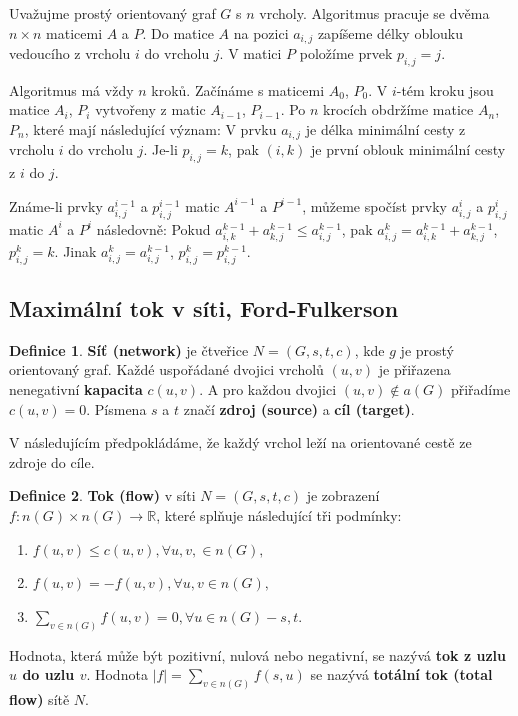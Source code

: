 \documentclass[a4]{report}
\theoremstyle{definition}
\newtheorem{definition}{Definice}[section]
\begin{document}
Uvažujme prostý orientovaný graf $G$ s $n$ vrcholy. Algoritmus pracuje se dvěma $n \times n$
maticemi $A$ a $P$. Do matice $A$ na pozici $a_{i,j}$ zapíšeme délky oblouku vedoucího z vrcholu $i$ do vrcholu $j$. V matici $P$ položíme prvek $p_{i,j} = j$.

Algoritmus má vždy $n$ kroků. Začínáme s maticemi $A_0$, $P_0$. V $i$-tém kroku jsou matice $A_i$, $P_i$ vytvořeny z matic $A_{i-1}$, $P_{i-1}$. Po $n$ krocích obdržíme matice $A_n$, $P_n$, které mají následující význam: V prvku $a_{i,j}$ je délka minimální cesty z vrcholu $i$ do vrcholu $j$. Je-li $p_{i,j} = k$, pak $(i,k)$ je první oblouk minimální cesty z $i$ do $j$.

Známe-li prvky $a^{i-1}_{i,j}$ a $p^{i-1}_{i,j}$ matic $A^{i-1}$ a $P^{i-1}$,
můžeme spočíst prvky $a^{i}_{i,j}$ a $p^{i}_{i,j}$ matic $A^{i}$ a $P^{i}$ následovně: Pokud $a^{k-1}_{i,k}+a^{k-1}_{k,j} \leq a^{k-1}_{i,j}$, pak $a^k_{i,j}=a^{k-1}_{i,k}+a^{k-1}_{k,j}$,  $p^k_{i,j}=k$. Jinak $a^k_{i,j}=a^{k-1}_{i,j}$,  $p^k_{i,j}=p^{k-1}_{i,j}$.

\subsection{Maximální tok v síti, Ford-Fulkerson}

\begin{definition}
\textbf{Síť (network)} je čtveřice $N = (G, s, t, c)$, kde $g$ je prostý orientovaný graf. Každé uspořádané dvojici vrcholů $(u,v)$ je přiřazena nenegativní \textbf{kapacita} $c(u,v)$. A pro každou dvojici $(u,v) \notin a(G)$ přiřadíme $c(u,v) = 0$. Písmena $s$ a $t$ značí \textbf{zdroj (source)} a \textbf{cíl (target)}.
\end{definition}

V následujícím předpokládáme, že každý vrchol leží na orientované cestě ze zdroje do cíle.

\begin{definition}
\textbf{Tok (flow)} v síti $N=(G,s,t,c)$ je zobrazení $f:n(G) \times n(G) \rightarrow \mathbb{R}$, které splňuje následující tři podmínky:
\begin{enumerate}
    \item $f(u,v) \leq c(u,v), \forall u, v, \in n(G),$
    \item $f(u,v) = -f(u,v), \forall u,v \in n(G),$
    \item $\sum_{v \in n(G)} f(u,v) = 0, \forall u \in n(G) - {s,t}.$
\end{enumerate}
Hodnota, která může být pozitivní, nulová nebo negativní, se nazývá \textbf{tok z uzlu $u$ do uzlu $v$}. Hodnota $|f| = \sum_{v \in n(G)} f(s,u)$ se nazývá \textbf{totální tok (total flow)} sítě $N$.
\end{definition}
\end{document}
